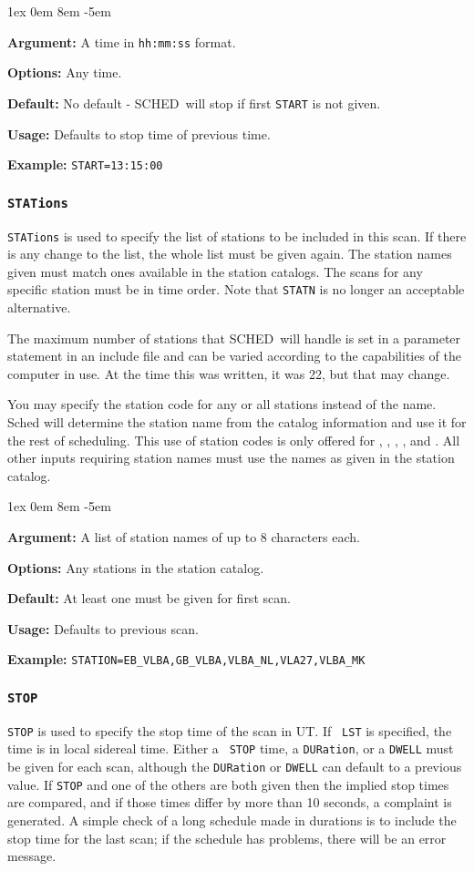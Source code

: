 \documentclass{report}
\newcommand{\schedb}{{\sc SCHED~}}
\newcommand{\rcwbox}[5]{
  \begin{list}{}{\parsep 1ex  \itemsep 0em
                 \leftmargin 8em  \itemindent -5em }
    \item {\bf Argument:} #1
    \item {\bf Options:}  #2
    \item {\bf Default:}  #3
    \item {\bf Usage:}    #4
    \item {\bf Example:}  #5
  \end{list}
}
\begin{document}
\rcwbox
{A time in {\tt hh:mm:ss} format.}
{Any time.}
{No default - \schedb will stop if first {\tt START} is not
given.}
{Defaults to stop time of previous time.}
{{\tt START=13:15:00}}


\subsubsection{\label{MP:STATIONS}{\tt STATions}}

{\tt STATions} is used to specify the list of stations to be included
in this scan. If there is any change to the list, the whole list
must be given again. The station names given must match ones
available in the station catalogs. The scans for any specific station
must be in time order.  Note that {\tt STATN} is no longer an
acceptable alternative.

The maximum number of stations that \schedb will handle is set
in a parameter statement in an include file and can be varied according
to the capabilities of the computer in use.  At the time this was
written, it was 22, but that may change.

You may specify the station code for any or all stations instead of
the name.  Sched will determine the station name from the catalog
information and use it for the rest of scheduling.  This use of
station codes is only offered for ,
, ,
, and .
All other inputs requiring station names must use the names as given
in the station catalog.

\rcwbox
{A list of station names of up to 8 characters each.}
{Any stations in the station catalog.}
{At least one must be given for first scan.}
{Defaults to previous scan.}
{{\tt STATION=EB\_VLBA,GB\_VLBA,VLBA\_NL,VLA27,VLBA\_MK}}


\subsubsection{\label{MP:STOP}{\tt STOP}}

{\tt STOP} is used to specify the stop time of the scan in UT. If {\tt
LST} is specified, the time is in local sidereal time. Either a {\tt
STOP} time, a {\tt DURation}, or a {\tt DWELL} must be given for each
scan, although the {\tt DURation} or {\tt DWELL} can default to a
previous value. If {\tt STOP} and one of the others are both given
then the implied stop times are compared, and if those times differ by
more than 10 seconds, a complaint is generated. A simple check of
a long schedule made in durations is to include the stop time for the
last scan; if the schedule has problems, there will be an error
message.
\end{document}
